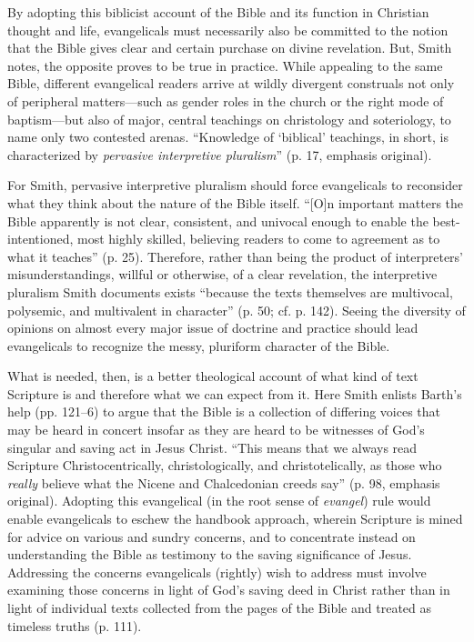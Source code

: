By adopting this biblicist account of the Bible and its function in Christian thought and life, evangelicals must necessarily also be committed to the notion that the Bible gives clear and certain purchase on divine revelation. But, Smith notes, the opposite proves to be true in practice. While appealing to the same Bible, different evangelical readers arrive at wildly divergent construals not only of peripheral matters—such as gender roles in the church or the right mode of baptism—but also of major, central teachings on christology and soteriology, to name only two contested arenas. “Knowledge of ‘biblical’ teachings, in short, is characterized by \emph{pervasive interpretive pluralism}” (p. 17, emphasis original).

For Smith, pervasive interpretive pluralism should force evangelicals to reconsider what they think about the nature of the Bible itself. “[O]n important matters the Bible apparently is not clear, consistent, and univocal enough to enable the best-intentioned, most highly skilled, believing readers to come to agreement as to what it teaches” (p. 25). Therefore, rather than being the product of interpreters’ misunderstandings, willful or otherwise, of a clear revelation, the interpretive pluralism Smith documents exists “because the texts themselves are multivocal, polysemic, and multivalent in character” (p. 50; cf. p. 142). Seeing the diversity of opinions on almost every major issue of doctrine and practice should lead evangelicals to recognize the messy, pluriform character of the Bible.

What is needed, then, is a better theological account of what kind of text Scripture is and therefore what we can expect from it. Here Smith enlists Barth’s help (pp. 121--6) to argue that the Bible is a collection of differing voices that may be heard in concert insofar as they are heard to be witnesses of God’s singular and saving act in Jesus Christ. “This means that we always read Scripture Christocentrically, christologically, and christotelically, as those who \emph{really} believe what the Nicene and Chalcedonian creeds say” (p. 98, emphasis original). Adopting this evangelical (in the root sense of \emph{evangel}) rule would enable evangelicals to eschew the handbook approach, wherein Scripture is mined for advice on various and sundry concerns, and to concentrate instead on understanding the Bible as testimony to the saving significance of Jesus. Addressing the concerns evangelicals (rightly) wish to address must involve examining those concerns in light of God’s saving deed in Christ rather than in light of individual texts collected from the pages of the Bible and treated as timeless truths (p. 111).


